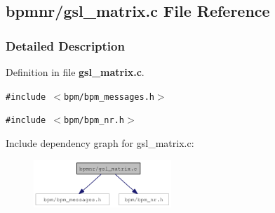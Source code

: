 \subsection{bpmnr/gsl\_\-matrix.c File Reference}
\label{gsl__matrix_8c}


\subsubsection{Detailed Description}


Definition in file {\bf gsl\_\-matrix.c}.

{\tt \#include $<$bpm/bpm\_\-messages.h$>$}\par
{\tt \#include $<$bpm/bpm\_\-nr.h$>$}\par


Include dependency graph for gsl\_\-matrix.c:\nopagebreak
\begin{figure}[H]
\begin{center}
\leavevmode
\includegraphics[width=147pt]{gsl__matrix_8c__incl}
\end{center}
\end{figure}
